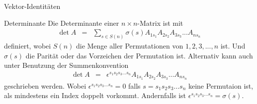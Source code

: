 \begin{chapter}{\titlestr}

\ifx\makebook\undefined
\begin{appendix}
\fi
\begin{section}{Vektor-Identitäten}
\begin{subsection}{Determinante}
Die Determinante einer $n\times n$-Matrix ist mit
\begin{eqnarray*}
\det{A} &=& \sum_{s\in S(n)}\sigma(s)A_{1s_1}A_{2s_2}A_{3s_3}...A_{ns_n}
\end{eqnarray*}
definiert, wobei $S(n)$ die Menge aller Permutationen von $1,2,3,...,n$ ist. Und $\sigma(s)$ die Parität oder das Vorzeichen der Permutation ist. Alternativ kann auch unter Benutzung der Summenkonvention 
\begin{eqnarray*}
\det{A} &=& \epsilon^{s_1s_2s_3...s_n}A_{1s_1}A_{2s_2}A_{3s_3}...A_{ns_n}
\end{eqnarray*}
geschrieben werden. Wobei $\epsilon^{s_1s_2s_3...s_n}=0$ falls $s=s_1s_2s_3...s_n$ keine Permutaion ist, als mindestens ein Index doppelt vorkommt. Andernfalls ist $\epsilon^{s_1s_2s_3...s_n}=\sigma(s)$.
\end{subsection}


\end{section}
\end{appendix}
\end{chapter}
